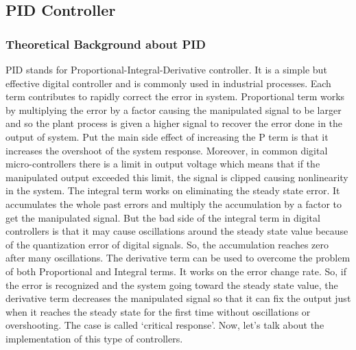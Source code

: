 \documentclass[12pt]{article}
\begin{document}
	\subsection{PID Controller}
	
	\subsubsection{Theoretical Background about PID}
	PID stands for Proportional-Integral-Derivative controller. It is a simple but effective digital controller and is commonly used in industrial processes. Each term contributes to rapidly correct the error in system. Proportional term works by multiplying the error by a factor causing the manipulated signal to be larger and so the plant process is given a higher signal to recover the error done in the output of system. Put the main side effect of increasing the P term is that it increases the overshoot of the system response. Moreover, in common digital micro-controllers there is a limit in output voltage which means that if the manipulated output exceeded this limit, the signal is clipped causing nonlinearity in the system. 
	The integral term works on eliminating the steady state error. It accumulates the whole past errors and multiply the accumulation by a factor to get the manipulated signal. But the bad side of the integral term in digital controllers is that it may cause oscillations around the steady state value because of the quantization error of digital signals. So, the accumulation reaches zero after many oscillations.
	The derivative term can be used to overcome the problem of both Proportional and Integral terms. It works on the error change rate. So, if the error is recognized and the system going toward the steady state value, the derivative term decreases the manipulated signal so that it can fix the output just when it reaches the steady state for the first time without oscillations or overshooting. The case is called ‘critical response’. Now, let’s talk about the implementation of this type of controllers.
	
	
\end{document}
